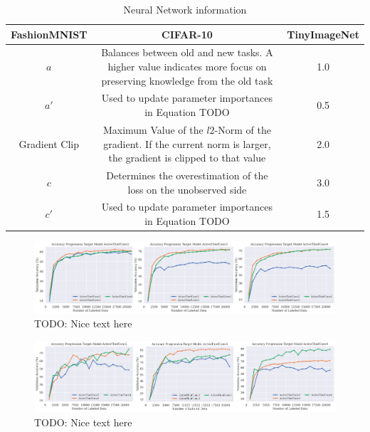 \begin{table}
    \centering
    \begin{tabularx}{\textwidth}{c | c c } 
        \hline
         FashionMNIST & CIFAR-10 & TinyImageNet \\ 
        \hline 
        $a$ & Balances between old and new tasks. A higher value indicates more focus
        on preserving knowledge from the old task & 1.0  \\ 
        $a'$ & Used to update parameter importances in Equation TODO & 0.5  \\
        Gradient Clip & Maximum Value of the $l2$-Norm of the gradient. If the current norm is larger, the
        gradient is clipped to that value & 2.0 \\ 
        $c$ & Determines the overestimation of the loss on the unobserved side & 3.0 \\
        $c'$ & Used to update parameter importances in Equation TODO & 1.5 \\
        \hline
    \end{tabularx}
    \caption{Neural Network information}
    \label{fig:NNArchitectures}
\end{table}


\begin{figure}[ht]
    \centering
    \includegraphics[width=\linewidth]{images/results_CALMS/cifar10_model_comp.png}
    \caption[Accuracy Progression for Model Stealing on CIFAR-10 using different ActiveThief models]{TODO: Nice text here}
    \label{fig:CIFAR10modelComp}
\end{figure}

\begin{figure}[ht]
    \centering
    \includegraphics[width=\linewidth]{images/results_CALMS/mnist_model_comp.png}
    \caption[Accuracy Progression for Model Stealing on MNIST using different ActiveThief models]{TODO: Nice text here}
    \label{fig:MNISTmodelComp}
\end{figure}